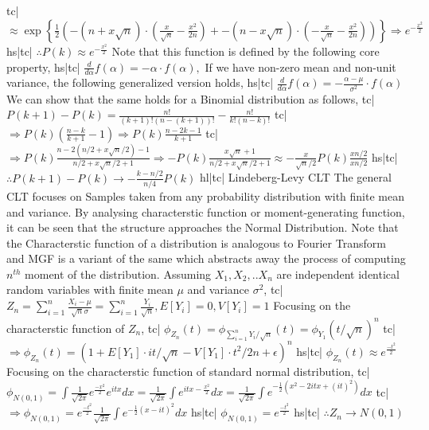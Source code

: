 tc| \( \approx \exp\left\{\frac{1}{2}\left(-(n + x\sqrt{n}) \cdot \left(\frac{x}{\sqrt{n}} - \frac{x^2}{2n}\right) + -(n - x\sqrt{n}) \cdot \left(-\frac{x}{\sqrt{n}} - \frac{x^2}{2n}\right) \right)\right\} \Rightarrow e^{-\frac{x^2}{2}} \)
hs|tc| \( \therefore P(k) \approx e^{-\frac{x^2}{2}} \)
Note that this function is defined by the following core property,
hs|tc| \( \frac{d}{d\alpha}f(\alpha)= -\alpha \cdot f(\alpha), \)
If we have non-zero mean and non-unit variance, the following generalized version holds,
hs|tc| \( \frac{d}{d\alpha}f(\alpha)= -\frac{\alpha-\mu}{\sigma^2} \cdot f(\alpha) \)
We can show that the same holds for a Binomial distribution as follows,
tc| \( P(k+1) - P(k) = \frac{n!}{(k+1)!(n-(k+1))!} - \frac{n!}{k!(n-k)!} \)
tc| \( \Rightarrow P(k)\left(\frac{n-k}{k+1} - 1\right) \Rightarrow P(k)\frac{n-2k-1}{k+1} \)
tc| \( \Rightarrow P(k)\frac{n-2(n/2 + x\sqrt{n}/2)-1}{n/2 + x\sqrt{n}/2 +1} \Rightarrow -P(k)\frac{x\sqrt{n} + 1}{n/2 + x\sqrt{n}/2 + 1} \approx -\frac{x}{\sqrt{n}/2}P(k)\frac{xn/2}{xn/2} \)
hs|tc| \( \therefore P(k+1)-P(k) \rightarrow -\frac{k-n/2}{n/4}P(k) \)
hl|tc| Lindeberg-Levy CLT
The general CLT focuses on Samples taken from any probability distribution with finite mean and variance. By analysing characterstic function or moment-generating function, it can be seen that the structure approaches the Normal Distribution.
Note that the Characterstic function of a distribution is analogous to Fourier Transform and MGF is a variant of the same which abstracts away the process of computing \(n^{th}\) moment of the distribution.
Assuming \({X_1,X_2,..X_n}\) are independent identical random variables with finite mean \(\mu\) and variance \(\sigma^2\),
tc| \( Z_n = \sum_{i=1}^{n}\frac{X_i - \mu}{\sqrt{n}\sigma} = \sum_{i=1}^{n}\frac{Y_i}{\sqrt{n}}, E[Y_i] = 0, V[Y_i] = 1 \)
Focusing on the characterstic function of \(Z_n\),
tc| \( \phi_{Z_n}(t) = \phi_{\sum_{i=1}^{n}Y_i/\sqrt{n}}(t) = \phi_{Y_1}(t/\sqrt{n})^n \)
tc| \( \Rightarrow \phi_{Z_n}(t) = (1 + E[Y_1]\cdot it/\sqrt{n} - V[Y_1]\cdot t^2/2n + \epsilon)^n \)
hs|tc| \( \phi_{Z_n}(t) \approx e^{\frac{-t^2}{2}} \)
Focusing on the characterstic function of standard normal distribution,
tc| \( \phi_{N(0,1)} = \int \frac{1}{\sqrt{2\pi}} e^{\frac{-x^2}{2}} e^{itx} dx = \frac{1}{\sqrt{2\pi}} \int e^{itx - \frac{x^2}{2}} dx = \frac{1}{\sqrt{2\pi}} \int e^{-\frac{1}{2} (x^2 - 2itx + (it)^2)} dx \)
tc| \( \Rightarrow \phi_{N(0,1)} = e^{\frac{-t^2}{2}} \frac{1}{\sqrt{2\pi}} \int e^{-\frac{1}{2} (x - it)^2} dx \)
hs|tc| \( \phi_{N(0,1)} = e^{\frac{-t^2}{2}} \)
hs|tc| \( \therefore Z_n \rightarrow N(0, 1) \)
